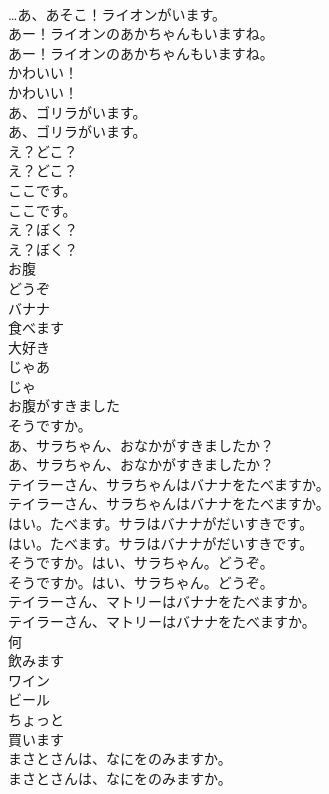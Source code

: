 \documentclass[8pt]{extreport}
\begin{document}
\begin{CJK}{UTF8}{min}
\\	…あ、あそこ！ライオンがいます。 
\\	あー！ライオンのあかちゃんもいますね。	
\\	あー！ライオンのあかちゃんもいますね。 
\\	かわいい！	
\\	かわいい！ 
\\	あ、ゴリラがいます。	
\\	あ、ゴリラがいます。 
\\	え？どこ？	
\\	え？どこ？ 
\\	ここです。	
\\	ここです。 
\\	え？ぼく？ 
\\	え？ぼく？ 
\\	お腹
\\	どうぞ
\\	バナナ
\\	食べます
\\	大好き
\\	じゃあ 
\\	じゃ
\\	お腹がすきました
\\	そうですか。
\\	あ、サラちゃん、おなかがすきましたか？	
\\	あ、サラちゃん、おなかがすきましたか？ 
\\	テイラーさん、サラちゃんはバナナをたべますか。	
\\	テイラーさん、サラちゃんはバナナをたべますか。 
\\	はい。たべます。サラはバナナがだいすきです。	
\\	はい。たべます。サラはバナナがだいすきです。 
\\	そうですか。はい、サラちゃん。どうぞ。	
\\	そうですか。はい、サラちゃん。どうぞ。 
\\	テイラーさん、マトリーはバナナをたべますか。	
\\	テイラーさん、マトリーはバナナをたべますか。 
\\	何
\\	飲みます
\\	ワイン
\\	ビール
\\	ちょっと
\\	買います
\\	まさとさんは、なにをのみますか。	
\\	まさとさんは、なにをのみますか。 

\end{CJK}
\end{document}
